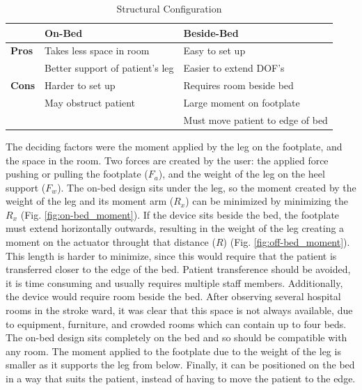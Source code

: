 \documentclass[12pt]{report}
\begin{document}
		
	\begin{table}[] \label{tab:config}
	\centering
	\caption{Structural Configuration }	
	\begin{tabular}{l|l|l}
		\hline
		& \textbf{On-Bed} & \textbf{Beside-Bed}  \\ \hline
		\textbf{Pros} & Takes less space in room  & Easy to set up  \\ 
		 & Better support of patient's leg  & Easier to extend DOF's \\ \hline
		 \textbf{Cons} & Harder to set up  & Requires room beside bed \\ 
		 & May obstruct patient  & Large moment on footplate \\ 
		 & & Must move patient to edge of bed \\ \hline

		\end{tabular}
	\label{tab:config}
	\end{table}
		


	The deciding factors were the moment applied by the leg on the footplate, and the space in the room. Two forces are created by the user: the applied force pushing or pulling the footplate ($F_a$), and the weight of the leg on the heel support ($F_w$). The on-bed design sits under the leg, so the moment created by the weight of the leg and its moment arm ($R_x$) can be minimized by minimizing the $R_x$ (Fig. \ref{fig:on-bed_moment}). If the device sits beside the bed, the footplate must extend horizontally outwards, resulting in the weight of the leg creating a moment on the actuator throught that distance ($R$) (Fig. \ref{fig:off-bed_moment}). This length is harder to minimize, since this would require that the patient is transferred closer to the edge of the bed. Patient transference should be avoided, it is time consuming and usually requires multiple staff members. Additionally, the device would require room beside the bed. After observing several hospital rooms in the stroke ward, it was clear that this space is not always available, due to equipment, furniture, and crowded rooms which can contain up to four beds. The on-bed design sits completely on the bed and so should be compatible with any room. The moment applied to the footplate due to the weight of the leg is smaller as it supports the leg from below. Finally, it can be positioned on the bed in a way that suits the patient, instead of having to move the patient to the edge. 
	
\end{document}
